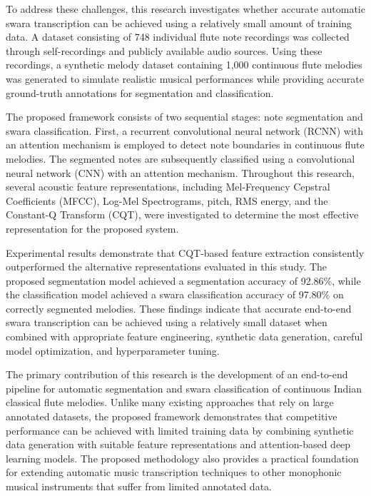 To address these challenges, this research investigates whether accurate automatic swara transcription can be achieved using a relatively small amount of training data. A dataset consisting of 748 individual flute note recordings was collected through self-recordings and publicly available audio sources. Using these recordings, a synthetic melody dataset containing 1,000 continuous flute melodies was generated to simulate realistic musical performances while providing accurate ground-truth annotations for segmentation and classification.

The proposed framework consists of two sequential stages: note segmentation and swara classification. First, a recurrent convolutional neural network (RCNN) with an attention mechanism is employed to detect note boundaries in continuous flute melodies. The segmented notes are subsequently classified using a convolutional neural network (CNN) with an attention mechanism. Throughout this research, several acoustic feature representations, including Mel-Frequency Cepstral Coefficients (MFCC), Log-Mel Spectrograms, pitch, RMS energy, and the Constant-Q Transform (CQT), were investigated to determine the most effective representation for the proposed system.

Experimental results demonstrate that CQT-based feature extraction consistently outperformed the alternative representations evaluated in this study. The proposed segmentation model achieved a segmentation accuracy of 92.86\%, while the classification model achieved a swara classification accuracy of 97.80\% on correctly segmented melodies. These findings indicate that accurate end-to-end swara transcription can be achieved using a relatively small dataset when combined with appropriate feature engineering, synthetic data generation, careful model optimization, and hyperparameter tuning.

The primary contribution of this research is the development of an end-to-end pipeline for automatic segmentation and swara classification of continuous Indian classical flute melodies. Unlike many existing approaches that rely on large annotated datasets, the proposed framework demonstrates that competitive performance can be achieved with limited training data by combining synthetic data generation with suitable feature representations and attention-based deep learning models. The proposed methodology also provides a practical foundation for extending automatic music transcription techniques to other monophonic musical instruments that suffer from limited annotated data.

